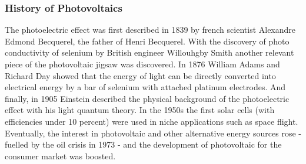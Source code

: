 \subsubsection{History of Photovoltaics}
The photoelectric effect was first described in 1839 by french scientist Alexandre Edmond Becquerel\cite{becquerel1839memoire}, the father of Henri Becquerel. 
With the discovery of photo conductivity of selenium
by British engineer Willouhgby Smith\cite{Smith1873Selenium} 
another relevant piece of the photovoltaic jigsaw was discovered. 
In 1876 William Adams and Richard Day\cite{Adams1876Selenium} showed that 
the energy of light can be directly converted into electrical energy by a bar of 
selenium with attached platinum electrodes.
And finally, in 1905 Einstein described the physical background of the photoelectric 
effect with his light quantum theory\cite{einstein1905erzeugung}.
In the 1950s the first solar cells (with efficiencies under 10 percent) were used in niche applications such as space flight. 
Eventually, the interest in photovoltaic and other alternative energy sources 
rose - fuelled by the oil crisis in 1973 - 
and the development of photovoltaic for the consumer market was boosted. \\

